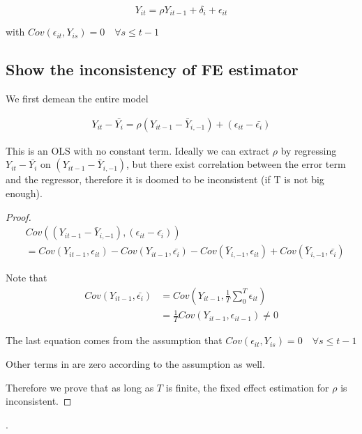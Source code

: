 \begin{equation*}
    Y_{it} = \rho Y_{i t-1} + \delta_i + \epsilon_{it}
\end{equation*}

with $Cov(\epsilon_{it}, Y_{is}) = 0 \quad \forall s \le t-1$

\subsection{Show the inconsistency of FE estimator}
We first demean the entire model

\begin{align*}
    Y_{it} - \bar{Y_i} = \rho (Y_{i t-1} - \bar{Y}_{i, -1}) + (\epsilon_{it} - \bar{\epsilon_i})
\end{align*}

This is an OLS with no constant term. Ideally we can extract $\rho$ 
by regressing $Y_{it} - \bar{Y_i}$ on $(Y_{i t-1} - \bar{Y}_{i, -1})$, 
but there exist correlation between the error term and the regressor, 
therefore it is doomed to be inconsistent (if T is not big enough).

\begin{proof}
    
    \begin{align}
        & Cov((Y_{i t-1} - \bar{Y}_{i, -1}), (\epsilon_{it} - \bar{\epsilon_i})) \nonumber \\
        &= Cov(Y_{i t-1}, \epsilon_{it}) - Cov(Y_{i t-1}, \bar{\epsilon_i})
            -Cov(\bar{Y}_{i, -1}, \epsilon_{it}) + Cov(\bar{Y}_{i, -1}, \bar{\epsilon_i}) \label{eq:all_cov}
    \end{align}

    Note that 
    \begin{align*}
        Cov(Y_{i t-1}, \bar{\epsilon_i}) &= Cov(Y_{i t-1}, \frac{1}{T}\sum_0^{T} \epsilon_{it})\\
        &= \frac{1}{T} Cov(Y_{i t-1}, \epsilon_{it-1}) \neq 0
    \end{align*}

    The last equation comes from the assumption that  $Cov(\epsilon_{it}, Y_{is}) = 0 \quad \forall s \le t-1$

    Other terms in  are zero according to the assumption as well.

    Therefore we prove that as long as $T$ is finite, the fixed effect estimation for $\rho$ 
    is inconsistent.

\end{proof}.

